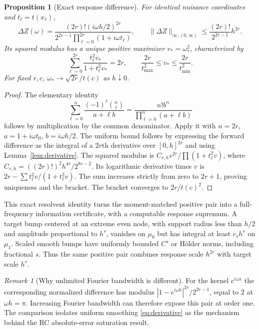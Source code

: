 \documentclass[10pt]{amsart}
\newtheorem{proposition}[theorem]{Proposition}
\theoremstyle{definition}
\theoremstyle{remark}
\newtheorem{remark}[theorem]{Remark}
\begin{document}
\begin{proposition}[Exact response difference]\label{prop:identity}
For identical nuisance coordinates and $t_\ell=t(x_\ell)$,
\begin{equation}\label{eq:identity}
 \Delta Z(\omega)=\frac{(2r)!(i\omega h/2)^{2r}}
 {2^{2r-1}\prod_{\ell=0}^{2r}(1+i\omega t_\ell)},\qquad
 \|\Delta Z\|_{\infty,(0,\infty)}\le\frac{(2r)!}{2^{2r-1}}h^{2r}.
\end{equation}
Its squared modulus has a unique positive maximizer $v_*=\omega_*^2$, characterized by
\begin{equation}\label{eq:maximizer}
 \sum_{\ell=0}^{2r}\frac{t_\ell^2v_*}{1+t_\ell^2v_*}=2r,
 \qquad \frac{2r}{t_{\max}^2}\le v_*\le\frac{2r}{t_{\min}^2}.
\end{equation}
For fixed $r,c$, $\omega_*\to\sqrt{2r}/t(c)$ as $h\downarrow0$.
\end{proposition}
\begin{proof}
The elementary identity
\[
 \sum_{\ell=0}^n\frac{(-1)^\ell\binom n\ell}{a+\ell b}
 =\frac{n!b^n}{\prod_{\ell=0}^n(a+\ell b)}
\]
follows by multiplication by the common denominator. Apply it with $n=2r$, $a=1+i\omega t_0$, $b=i\omega h/2$. The uniform bound follows by expressing the forward difference as the integral of a $2r$th derivative over $[0,h]^{2r}$ and using Lemma~\ref{lem:derivative}. The squared modulus is $C_{r,h}v^{2r}/\prod(1+t_\ell^2v)$, where $C_{r,h}=((2r)!)^2h^{4r}/2^{8r-2}$. Its logarithmic derivative times $v$ is $2r-\sum t_\ell^2v/(1+t_\ell^2v)$. The sum increases strictly from zero to $2r+1$, proving uniqueness and the bracket. The bracket converges to $2r/t(c)^2$.
\end{proof}

This exact resolvent identity turns the moment-matched positive pair into a full-frequency information certificate, with a computable response supremum. A target bump centered at an extreme even node, with support radius less than $h/2$ and amplitude proportional to $h^s$, vanishes on $\mu_0$ but has integral at least $c_sh^s$ on $\mu_1$. Scaled smooth bumps have uniformly bounded $C^s$ or H\"older norms, including fractional $s$. Thus the same positive pair combines response scale $h^{2r}$ with target scale $h^s$.

\begin{remark}[Why unlimited Fourier bandwidth is different]\label{rem:fourier}
For the kernel $e^{i\omega x}$ the corresponding normalized difference has modulus $|1-e^{i\omega h}|^{2r}/2^{2r-1}$, equal to $2$ at $\omega h=\pi$. Increasing Fourier bandwidth can therefore expose this pair at order one. The comparison isolates uniform smoothing \eqref{eq:derivative} as the mechanism behind the RC absolute-error saturation result.
\end{remark}
\end{document}
